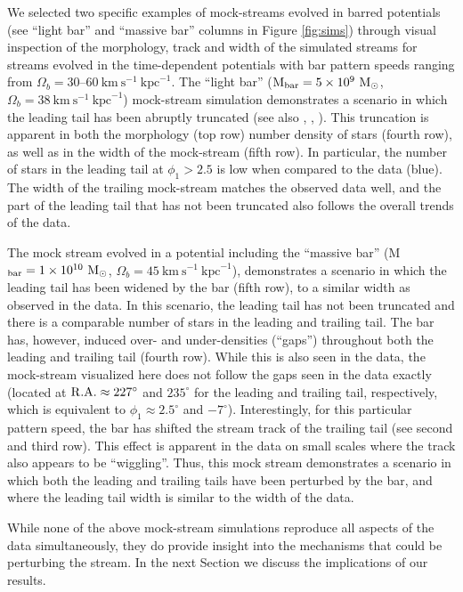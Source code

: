 \documentclass[twocolumn]{aastex62}
\newcommand{\msun}{\textrm{M}_\odot}
\newcommand{\kmskpc}{\ensuremath{\textrm{km}~\textrm{s}^{-1}~\textrm{kpc}^{-1}}}
\begin{document}
We selected two specific examples of mock-streams evolved in barred potentials (see ``light bar'' and ``massive bar'' columns in Figure \ref{fig:sims}) through visual inspection of the morphology, track and width of the simulated streams for streams evolved in the time-dependent potentials with bar pattern speeds ranging from $\Omega_b = 30$--$60~\kmskpc$.
The ``light bar''  ($\textrm{M}_{\rm bar} = 5\times 10^{9}~\msun$, $\Omega_b = 38 ~\kmskpc$) mock-stream simulation demonstrates a scenario in which the leading tail has been abruptly truncated (see also \citealt{Price-Whelan:2016b}, \citealt{Pearson:2017}, \citealt{Erkal:2017}).
This truncation is apparent in both the morphology (top row) number density of stars (fourth row), as well as in the width of the mock-stream (fifth row).
In particular, the number of stars in the leading tail at $\phi_1 > 2.5$ is low when compared to the data (blue).
The width of the trailing mock-stream matches the observed data well, and the part of the leading tail that has not been truncated also follows the overall trends of the data.

The mock stream evolved in a potential including the  ``massive bar'' (M$_{\rm bar} = 1\times 10^{10}~\msun$, $\Omega_b = 45~\kmskpc$), demonstrates a scenario in which the leading tail has been widened by the bar (fifth row), to a similar width as observed in the data.
In this scenario, the leading tail has not been truncated and there is a comparable number of stars in the leading and trailing tail.
The bar has, however, induced over- and under-densities (``gaps'') throughout both the leading and trailing tail  (fourth row).
While this is also seen in the data, the mock-stream visualized here does not follow the gaps seen in the data exactly (located at $\rm R.A.\approx 227^\circ$ and $235^\circ$ for the leading and trailing tail, respectively, which is equivalent to $\phi_1 \approx 2.5^\circ$ and $-7^\circ$).
Interestingly, for this particular pattern speed, the bar has shifted the stream track of the trailing tail  (see second and third row).
This effect is apparent in the data on small scales where the track also appears to be ``wiggling''.
Thus, this mock stream demonstrates a scenario in which both the leading and trailing tails have been perturbed by the bar, and where the leading tail width is similar to the width of the data.

While none of the above mock-stream simulations reproduce all aspects of the data simultaneously, they do provide insight into the mechanisms that could be perturbing the stream.
In the next Section we discuss the implications of our results.
\end{document}
